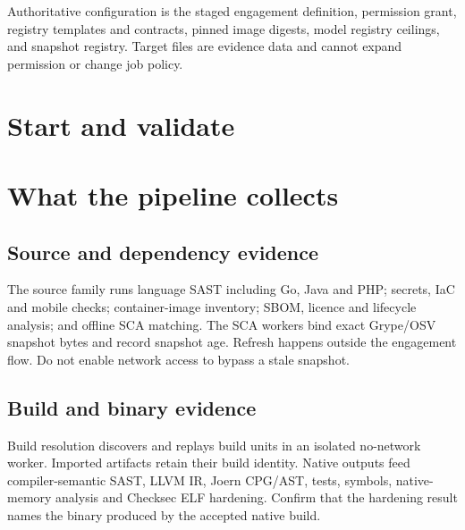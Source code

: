 \documentclass[10pt,a4paper]{article}
\begin{document}
Authoritative configuration is the staged engagement definition, permission grant, registry
templates and contracts, pinned image digests, model registry ceilings, and snapshot registry.
Target files are evidence data and cannot expand permission or change job policy.

\section{Start and validate}
\begin{steps}
\end{steps}

\section{What the pipeline collects}
\subsection{Source and dependency evidence}
The source family runs language SAST including Go, Java and PHP; secrets, IaC and mobile checks;
container-image inventory; SBOM, licence and lifecycle analysis; and offline SCA matching. The SCA
workers bind exact Grype/OSV snapshot bytes and record snapshot age. Refresh happens outside the
engagement flow. Do not enable network access to bypass a stale snapshot.

\subsection{Build and binary evidence}
Build resolution discovers and replays build units in an isolated no-network worker. Imported
artifacts retain their build identity. Native outputs feed compiler-semantic SAST, LLVM IR,
Joern CPG/AST, tests, symbols, native-memory analysis and Checksec ELF hardening. Confirm that the
hardening result names the binary produced by the accepted native build.
\end{document}
